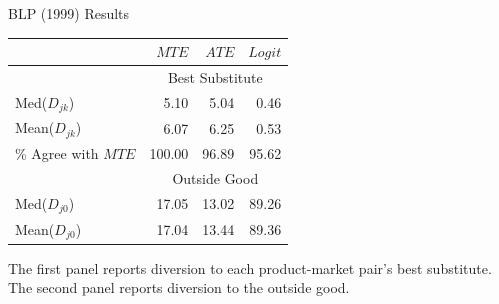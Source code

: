 \documentclass[xcolor=pdftex,dvipsnames,table,mathserif,aspectratio=169]{beamer}
\begin{document}
\begin{frame}{BLP (1999) Results}
\begin{center}
\begin{tabular}{lrrr}
{} &  $MTE$  &  $ATE$ &  $Logit$ \\ \hline
& \multicolumn{3}{c}{Best Substitute}\\ \hline
Med($D_{jk}$)  &    5.10 &   5.04 &   0.46 \\
Mean($D_{jk}$) &    6.07 &   6.25 &   0.53 \\
\% Agree with $MTE$    &  100.00 &  96.89 &  95.62 \\
\hline
& \multicolumn{3}{c}{Outside Good}\\ \hline
Med($D_{j0}$)  &   17.05 &  13.02 &  89.26 \\
Mean($D_{j0}$) &   17.04 &  13.44 &  89.36 \\ \hline
\end{tabular}
\end{center}
The first panel reports diversion to each product-market pair's best substitute. The second panel reports diversion to the outside good.
\end{frame}
\end{document}
